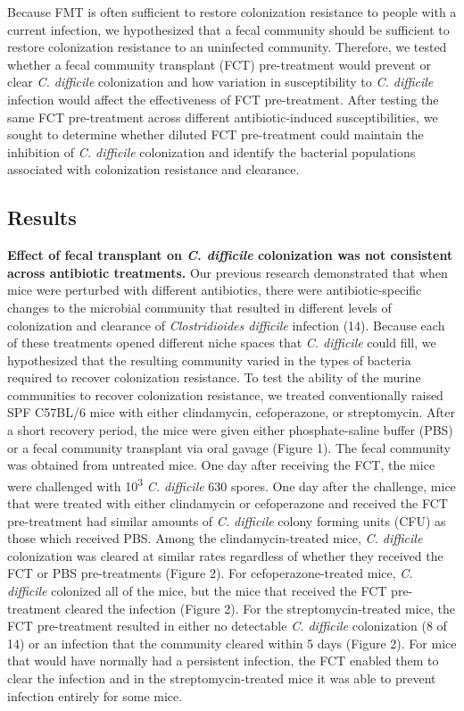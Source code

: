 \documentclass[
  12pt,
]{article}
\begin{document}
Because FMT is often sufficient to restore colonization resistance to
people with a current infection, we hypothesized that a fecal community
should be sufficient to restore colonization resistance to an uninfected
community. Therefore, we tested whether a fecal community transplant
(FCT) pre-treatment would prevent or clear \emph{C. difficile}
colonization and how variation in susceptibility to \emph{C. difficile}
infection would affect the effectiveness of FCT pre-treatment. After
testing the same FCT pre-treatment across different antibiotic-induced
susceptibilities, we sought to determine whether diluted FCT
pre-treatment could maintain the inhibition of \emph{C. difficile}
colonization and identify the bacterial populations associated with
colonization resistance and clearance.

\hypertarget{results}{%
\subsection{Results}\label{results}}

\textbf{Effect of fecal transplant on \emph{C. difficile} colonization
was not consistent across antibiotic treatments.} Our previous research
demonstrated that when mice were perturbed with different antibiotics,
there were antibiotic-specific changes to the microbial community that
resulted in different levels of colonization and clearance of
\emph{Clostridioides difficile} infection (14). Because each of these
treatments opened different niche spaces that \emph{C. difficile} could
fill, we hypothesized that the resulting community varied in the types
of bacteria required to recover colonization resistance. To test the
ability of the murine communities to recover colonization resistance, we
treated conventionally raised SPF C57BL/6 mice with either clindamycin,
cefoperazone, or streptomycin. After a short recovery period, the mice
were given either phosphate-saline buffer (PBS) or a fecal community
transplant via oral gavage (Figure 1). The fecal community was obtained
from untreated mice. One day after receiving the FCT, the mice were
challenged with 10\textsuperscript{3} \emph{C. difficile} 630 spores.
One day after the challenge, mice that were treated with either
clindamycin or cefoperazone and received the FCT pre-treatment had
similar amounts of \emph{C. difficile} colony forming units (CFU) as
those which received PBS. Among the clindamycin-treated mice, \emph{C.
difficile} colonization was cleared at similar rates regardless of
whether they received the FCT or PBS pre-treatments (Figure 2). For
cefoperazone-treated mice, \emph{C. difficile} colonized all of the
mice, but the mice that received the FCT pre-treatment cleared the
infection (Figure 2). For the streptomycin-treated mice, the FCT
pre-treatment resulted in either no detectable \emph{C. difficile}
colonization (8 of 14) or an infection that the community cleared within
5 days (Figure 2). For mice that would have normally had a persistent
infection, the FCT enabled them to clear the infection and in the
streptomycin-treated mice it was able to prevent infection entirely for
some mice.
\end{document}
